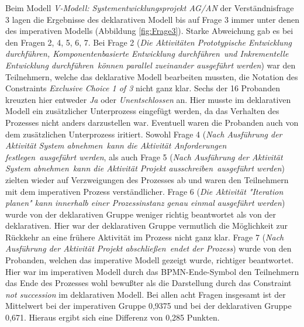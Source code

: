 Beim Modell \textit{V-Modell: Systementwicklungsprojekt AG/AN} der Verständnisfrage 3 lagen die Ergebnisse des deklarativen Modell bis auf Frage 3 immer unter denen des imperativen Modells (Abbildung \ref{fig:Frage3}). Starke Abweichung gab es bei den Fragen 2, 4, 5, 6, 7. \newline
Bei Frage 2 (\textit{Die Aktivitäten \grqq Prototypische Entwicklung durchführen\grqq, \grqq Komponentenbasierte Entwicklung durchführen\grqq \ und \grqq Inkrementelle Entwicklung durchführen\grqq \ können parallel zueinander ausgeführt werden}) war den Teilnehmern, welche das deklarative Modell bearbeiten mussten, die Notation des Constraints \textit {Exclusive Choice 1 of 3} nicht ganz klar. Sechs der 16 Probanden kreuzten hier entweder \textit{Ja} oder \textit{Unentschlossen} an. Hier musste im deklarativen Modell ein zusätzlicher Unterprozess eingefügt werden, da das Verhalten des Prozesses nicht anders darzustellen war. Eventuell waren die Probanden auch von dem zusätzlichen Unterprozess iritiert.\newline
Sowohl Frage 4 (\textit{Nach Ausführung der Aktivität \grqq System abnehmen\grqq \ kann die Aktivität \grqq Anforderungen festlegen\grqq \ ausgeführt werden}, als auch Frage 5 (\textit{Nach Ausführung der Aktivität \grqq System abnehmen\grqq \ kann die Aktivität \grqq Projekt ausschreiben\grqq \ ausgeführt werden}) zielten wieder auf Verzweigungen des Prozesses ab und waren den Teilnehmern mit dem imperativen Prozess verständlicher. \newline
Frage 6 (\textit{Die Aktivität "Iteration planen" kann innerhalb einer Prozessinstanz genau einmal ausgeführt werden}) wurde von der deklarativen Gruppe weniger richtig beantwortet als von der deklarativen. Hier war der deklarativen Gruppe vermutlich die Möglichkeit zur Rückkehr an eine frühere Aktivität im Prozess nicht ganz klar. \newline
Frage 7 (\textit{Nach Ausführung der Aktivität \grqq Projekt abschließen\grqq \ endet der Prozess}) wurde von den Probanden, welchen das imperative Modell gezeigt wurde, richtiger beantwortet. Hier war im imperativen Modell durch das BPMN-Ende-Symbol den Teilnehmern das Ende des Prozesses wohl bewußter als die Darstellung durch das Constraint \textit{not succession} im deklarativen Modell.\newline
Bei allen acht Fragen insgesamt ist der Mittelwert bei der imperativen Gruppe 0,9375 und bei der deklarativen Gruppe 0,671. Hieraus ergibt sich eine Differenz von 0,285 Punkten. \newline


